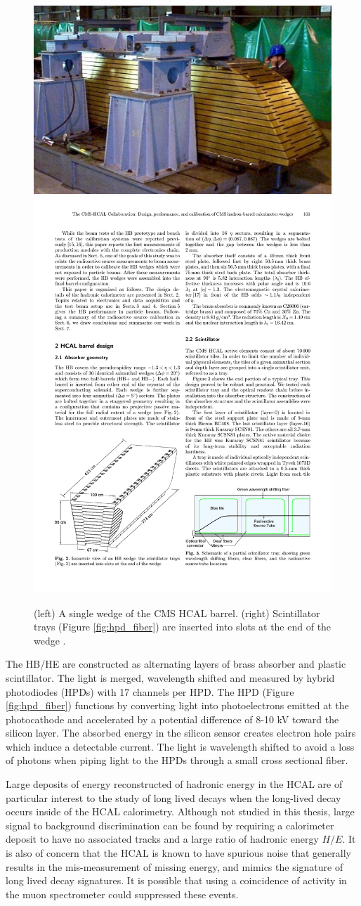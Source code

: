 \begin{figure}
\begin{center}
\includegraphics[width=.45\textwidth]{pics/hb_wedge}
\includegraphics[width=.45\textwidth]{pics/HBwedge}
\end{center}
\caption{(left) A single wedge of the CMS HCAL barrel. (right) Scintillator trays (Figure \ref{fig:hpd_fiber}) are inserted into 
slots at the end of the wedge \cite{hcalcalib}.}
\label{fig:hb_wedge}
\end{figure}

The HB/HE are constructed as alternating layers of brass absorber and plastic scintillator. 
The light is merged, wavelength shifted and measured by hybrid photodiodes (HPDs) with 17 channels per HPD. The HPD
(Figure \ref{fig:hpd_fiber}) functions by converting light into photoelectrons emitted at the photocathode and accelerated
by a potential difference of 8-10 kV toward the silicon layer. The absorbed energy in the silicon sensor creates 
electron hole pairs which induce a detectable current. The light is wavelength shifted to avoid a loss of photons 
when piping light to the HPDs through a small cross sectional fiber.

Large deposits of energy reconstructed of hadronic energy in the HCAL are of particular interest 
to the study of long lived decays when the long-lived decay occurs inside of the HCAL calorimetry. Although 
not studied in this thesis, large signal to background discrimination can be found by
 requiring a calorimeter deposit to have no
associated tracks and a large ratio of hadronic energy $H/E$. It is also of concern that 
the HCAL is known to have spurious noise that generally results in the mis-measurement 
of missing energy, and mimics the signature of long lived decay signatures. It is possible
that using a coincidence of activity in the muon spectrometer could suppressed these events.  

